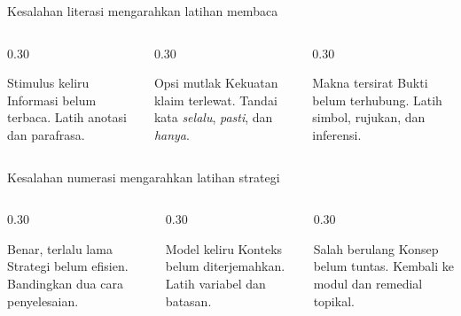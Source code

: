 \begin{frame}{Kesalahan literasi mengarahkan latihan membaca}
  \begin{columns}[T,onlytextwidth]
    \begin{column}{0.30\textwidth}
      \begin{block}{Stimulus keliru}
        Informasi belum terbaca. Latih anotasi dan parafrasa.
      \end{block}
    \end{column}
    \begin{column}{0.30\textwidth}
      \begin{block}{Opsi mutlak}
        Kekuatan klaim terlewat. Tandai kata \emph{selalu}, \emph{pasti}, dan \emph{hanya}.
      \end{block}
    \end{column}
    \begin{column}{0.30\textwidth}
      \begin{block}{Makna tersirat}
        Bukti belum terhubung. Latih simbol, rujukan, dan inferensi.
      \end{block}
    \end{column}
  \end{columns}
  \vspace{0.18cm}
\end{frame}

\begin{frame}{Kesalahan numerasi mengarahkan latihan strategi}
  \begin{columns}[T,onlytextwidth]
    \begin{column}{0.30\textwidth}
      \begin{block}{Benar, terlalu lama}
        Strategi belum efisien. Bandingkan dua cara penyelesaian.
      \end{block}
    \end{column}
    \begin{column}{0.30\textwidth}
      \begin{block}{Model keliru}
        Konteks belum diterjemahkan. Latih variabel dan batasan.
      \end{block}
    \end{column}
    \begin{column}{0.30\textwidth}
      \begin{block}{Salah berulang}
        Konsep belum tuntas. Kembali ke modul dan remedial topikal.
      \end{block}
    \end{column}
  \end{columns}
  \vspace{0.18cm}
\end{frame}

